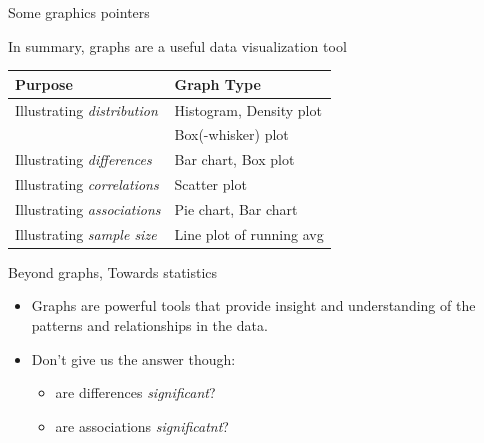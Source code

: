 \documentclass[ignorenonframetext,t]{beamer}
\providecommand{\tightlist}{%
  \setlength{\itemsep}{0pt}\setlength{\parskip}{0pt}}
\begin{document}
\begin{frame}{Some graphics pointers}

In summary, graphs are a useful data visualization tool

\vspace{1cm}

\begin{longtable}[]{@{}ll@{}}
\toprule
Purpose & Graph Type\tabularnewline
\midrule
\endhead
Illustrating \emph{distribution} & Histogram, Density
plot\tabularnewline
& Box(-whisker) plot\tabularnewline
Illustrating \emph{differences} & Bar chart, Box plot\tabularnewline
Illustrating \emph{correlations} & Scatter plot\tabularnewline
Illustrating \emph{associations} & Pie chart, Bar chart\tabularnewline
Illustrating \emph{sample size} & Line plot of running
avg\tabularnewline
\bottomrule
\end{longtable}

\end{frame}

\begin{frame}{Beyond graphs, Towards statistics}

\begin{itemize}
\item
  Graphs are powerful tools that provide insight and understanding of
  the patterns and relationships in the data.
\item
  Don't give us the answer though:

  \begin{itemize}
  \tightlist
  \item
    are differences \emph{significant}?
  \item
    are associations \emph{significatnt}?
  \end{itemize}
\end{itemize}


\end{frame}
\end{document}
